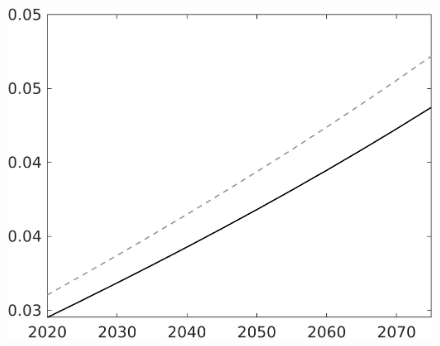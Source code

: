 \documentclass[12pt]{article}
\begin{document}
\begin{figure}
\begin{minipage}[]{0.32\textwidth}
	\end{minipage}
	\begin{minipage}[]{0.32\textwidth}
		\includegraphics[width=1\textwidth]{../../codding_model/own_basedOnFried/optimalPol_010922_revision/figures/all_13Sept22/LevTaufNoTauf_TaulCalib_regime0_wsn_spillover0_nsk0_xgr0_knspil1_sep1_LFlimit0_emsbase0_countec0_GovRev0_etaa0.79_lgd0.png}
	\end{minipage}
\end{figure}
\end{document}
